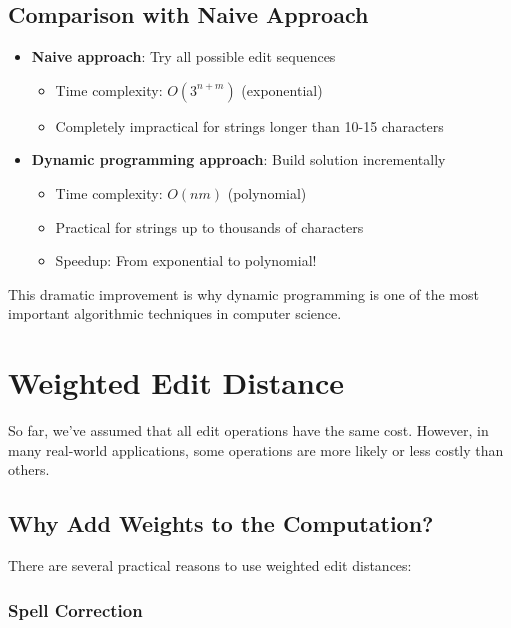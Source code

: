 \documentclass[11pt,a4paper]{article}
\theoremstyle{definition}
\theoremstyle{plain}
\theoremstyle{remark}
\begin{document}
\subsection{Comparison with Naive Approach}

\begin{itemize}
    \item \textbf{Naive approach}: Try all possible edit sequences
    \begin{itemize}
        \item Time complexity: $O(3^{n+m})$ (exponential)
        \item Completely impractical for strings longer than 10-15 characters
    \end{itemize}
    
    \item \textbf{Dynamic programming approach}: Build solution incrementally
    \begin{itemize}
        \item Time complexity: $O(nm)$ (polynomial)
        \item Practical for strings up to thousands of characters
        \item Speedup: From exponential to polynomial!
    \end{itemize}
\end{itemize}

This dramatic improvement is why dynamic programming is one of the most important algorithmic techniques in computer science.

\newpage
\section{Weighted Edit Distance}

So far, we've assumed that all edit operations have the same cost. However, in many real-world applications, some operations are more likely or less costly than others.

\subsection{Why Add Weights to the Computation?}

There are several practical reasons to use weighted edit distances:

\subsubsection{Spell Correction}
\end{document}
